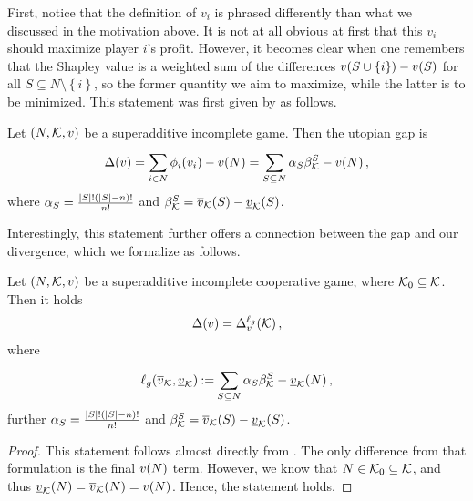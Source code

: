 First, notice that the definition of $ v_i $ is phrased differently than what we discussed in the motivation above.
It is not at all obvious at first that this $ v_i $ should maximize player $ i $'s profit.
However, it becomes clear when one remembers that the Shapley value is a weighted sum of the differences $ \fce{v}{S \cup \left\{ i \right\}} - \fce{v}{S} $ for all $ S \subseteq N \setminus \left\{ i \right\} $, so the former quantity we aim to maximize, while the latter is to be minimized.
This statement was first given by \cite{uradnik2024reducing} as follows.

\begin{lemma}
  \label{thm:uradniketal34}
  Let $ \left( N, \k, v \right) $ be a superadditive incomplete game.
  Then the utopian gap is \[
    \gap v = \sum_{i \in N}^{} \shapley[i] {v_i} - \fce{v}{N} = \sum_{S \subseteq N}^{} \alpha_S \beta_\k^S - \fce{v}{N},
  \]
  where $ \alpha_S = \frac{\absolute{S}! \left( \absolute{S} - n \right)!}{n!} $ and $ \beta_\k^S = \fce{\uf v}{S} - \fce{\lf v}{S} $.
\end{lemma}

Interestingly, this statement further offers a connection between the gap and our divergence, which we formalize as follows.

\begin{prop}
  Let $ \left( N, \k, v \right) $ be a superadditive incomplete cooperative game, where $ \k_0 \subseteq \k $.
  Then it holds \[
    \gap v = \divg[v] {\ell_g}\k,
  \]
  where \[
    \fce{\ell_g}{\uf v, \lf v} \deq \sum_{S \subseteq N}^{} \alpha_S \beta_\k^S - \fce{\lf v}{N},
  \]
  further $ \alpha_S = \frac{\absolute{S}! \left( \absolute{S} - n \right)!}{n!} $ and $ \beta_\k^S = \fce{\uf v}{S} - \fce{\lf v}{S} $.
\end{prop}

\begin{proof}
  This statement follows almost directly from .
  The only difference from that formulation is the final $ \fce{v}{N} $ term.
  However, we know that $ N \in \k_0 \subseteq \k $, and thus $ \fce{\lf v}{N} = \fce{\uf v}{N} = \fce{v}{N} $.
  Hence, the statement holds.
\end{proof}


